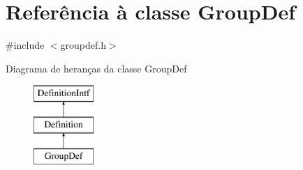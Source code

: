 \hypertarget{class_group_def}{\section{Referência à classe Group\-Def}
\label{class_group_def}
}


{\ttfamily \#include $<$groupdef.\-h$>$}

Diagrama de heranças da classe Group\-Def\begin{figure}[H]
\begin{center}
\leavevmode
\includegraphics[height=3.000000cm]{class_group_def}
\end{center}
\end{figure}
